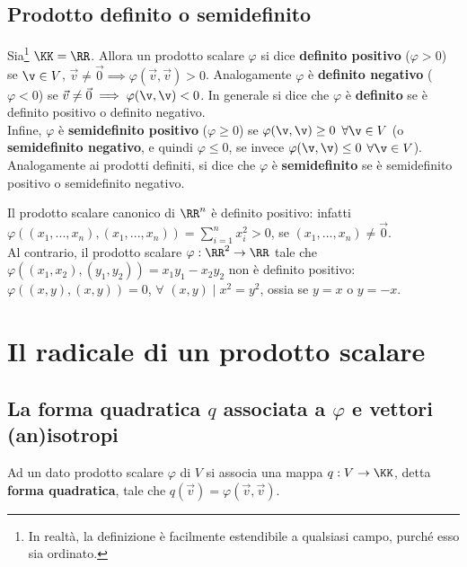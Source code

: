 \subsection{Prodotto definito o semidefinito}

\begin{definition}
	Sia\footnote{In realtà, la definizione è facilmente estendibile a qualsiasi campo, purché esso
		sia ordinato.} $\KK = \RR$. Allora un prodotto scalare $\varphi$ si dice \textbf{definito positivo} ($\varphi > 0$) se $\v \in V$, $\vec{v} \neq \vec{0} \implies
	\varphi(\vec{v}, \vec{v}) > 0$. Analogamente $\varphi$ è \textbf{definito negativo} ($\varphi < 0$) se $\vec{v} \neq \vec 0 \implies \varphi(\v, \v) < 0$. In generale si dice che $\varphi$ è \textbf{definito} se è definito positivo o
	definito negativo. \\
	
	Infine, $\varphi$ è \textbf{semidefinito positivo} ($\varphi \geq 0$) se $\varphi(\v, \v) \geq 0$ $\forall \v \in V$ (o
	\textbf{semidefinito negativo}, e quindi $\varphi \leq 0$, se invece $\varphi(\v, \v) \leq 0$ $\forall \v \in V$). Analogamente ai
	prodotti definiti, si dice che $\varphi$ è \textbf{semidefinito} se è semidefinito positivo o semidefinito
	negativo.
\end{definition}

\begin{example}
	Il prodotto scalare canonico di $\RR^n$ è definito positivo: infatti $\varphi((x_1, ..., x_n), (x_1, ..., x_n)) =
	\sum_{i=1}^n x_i^2  > 0$, se $(x_1, ..., x_n) \neq \vec 0$. \\
	
	Al contrario, il prodotto scalare $\varphi : \RR^2 \to \RR$ tale che $\varphi((x_1, x_2), (y_1, y_2)) = x_1 y_1 - x_2 y_2$ non è definito positivo: $\varphi((x, y), (x, y)) = 0$, $\forall$ $(x, y) \mid x^2 = y^2$, ossia se
	$y = x$ o $y = -x$.
\end{example}

\section{Il radicale di un prodotto scalare}

\subsection{La forma quadratica $q$ associata a \texorpdfstring{$\varphi$}{φ} e vettori (an)isotropi}

\begin{definition}
	Ad un dato prodotto scalare $\varphi$ di $V$ si associa una mappa
	$q : V \to \KK$, detta \textbf{forma quadratica}, tale che $q(\vec{v}) = \varphi(\vec{v}, \vec{v})$.
\end{definition}

